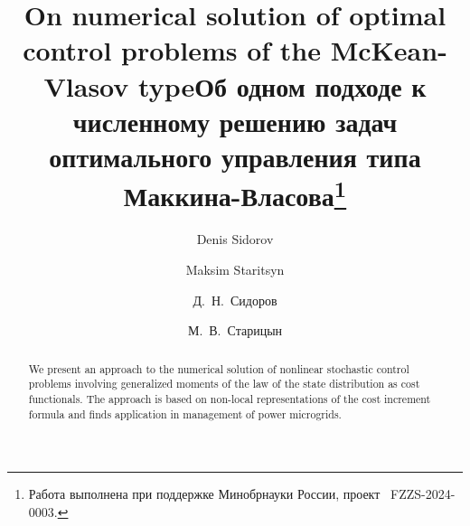 \begin{englishtitle} %
\title{On numerical solution of optimal control problems of the McKean-Vlasov type}
\author{Denis Sidorov \and Maksim Staritsyn
}

\maketitle

\begin{abstract}
We present an approach to the numerical solution of nonlinear stochastic control problems involving generalized moments of the law of the state distribution as cost functionals. The approach is based on non-local representations of the cost increment formula and finds application in management of power microgrids.

\end{abstract}
\end{englishtitle}

\iffalse
%
%


\documentclass[12pt]{llncs}  


\usepackage{iftex}

\ifPDFTeX
\usepackage[T2A]{fontenc}
\usepackage[utf8]{inputenc} %
\usepackage[english,russian]{babel}
\fi

\usepackage{todonotes} 

\usepackage[russian]{nla}


\fi

\title{Об одном подходе к численному решению задач оптимального управления типа Маккина-Власова\thanks{Работа выполнена при поддержке Минобрнауки России, проект \textnumero~FZZS-2024-0003.%
}}
\author{Д.~Н.~Сидоров \and М.~В.~Старицын
}

